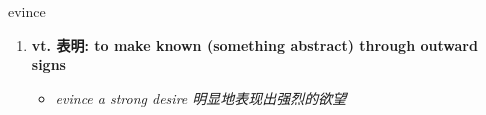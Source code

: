 
\begin{frame}
{\huge evince}
\begin{center}
\begin{enumerate}\Large
  \item \textbf{vt. 表明: to make known (something abstract) through outward signs}
  \begin{itemize}
    \item \em{\Large{evince a strong desire 明显地表现出强烈的欲望}}
  \end{itemize}
\end{enumerate}
\end{center}
\end{frame}
